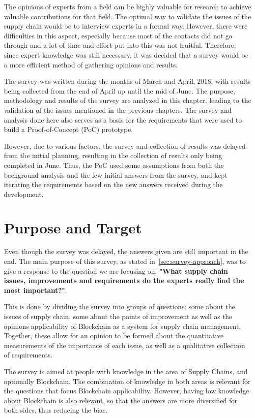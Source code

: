 The opinions of experts from a field can be highly valuable for research to achieve valuable contributions for that field. The optimal way to validate the issues of the supply chain would be to interview experts in a formal way. However, there were difficulties in this aspect, especially because most of the contacts did not go through and a lot of time and effort put into this was not fruitful. Therefore, since expert knowledge was still necessary, it was decided that a survey would be a more efficient method of gathering opinions and results.

The survey was written during the months of March and April, 2018, with results being collected from the end of April up until the mid of June. The purpose, methodology and results of the survey are analyzed in this chapter, leading to the validation of the issues mentioned in the previous chapters. The survey and analysis done here also serves as a basis for the requirements that were used to build a Proof-of-Concept (PoC) prototype. 

However, due to various factors, the survey and collection of results was delayed from the initial planning, resulting in the collection of results only being completed in June. Thus, the PoC used some assumptions from both the background analysis and the few initial answers from the survey, and kept iterating the requirements based on the new answers received during the development. 

\section{Purpose and Target}
Even though the survey was delayed, the answers given are still important in the end. The main purpose of this survey, as stated in~\ref{sec:survey-approach}, was to give a response to the question we are focusing on: \textbf{"What supply chain issues, improvements and requirements do the experts really find the most important?"}. 



This is done by dividing the survey into groups of questions: some about the issues of supply chain, some about the points of improvement as well as the opinions applicability of Blockchain as a system for supply chain management. Together, these allow for an opinion to be formed about the quantitative measurements of the importance of each issue, as well as a qualitative collection of requirements.

The survey is aimed at people with knowledge in the area of Supply Chains, and optionally Blockchain. The combination of knowledge in both areas is relevant for the questions that focus Blockchain applicability. However, having low knowledge about Blockchain is also relevant, so that the answers are more diversified for both sides, thus reducing the bias. %

